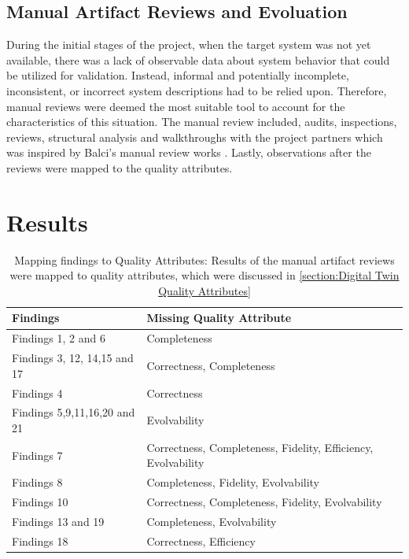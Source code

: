 \documentclass{llncs}
\begin{document}
    \subsection{Manual Artifact Reviews and Evoluation}
    During the initial stages of the project, when the target system was not yet available, there was a lack of observable data about system behavior that could be utilized for validation. 
    Instead, informal and potentially incomplete, inconsistent, or incorrect system descriptions had to be relied upon. Therefore, manual reviews were deemed the most suitable tool to account for the characteristics of this situation.
    The manual review included, audits, inspections, reviews, structural analysis 
    and walkthroughs with the project partners which was inspired by Balci's manual review works \cite{balcitechniques}. Lastly, observations after the reviews were mapped to the quality attributes. 
    \section{Results}
    

    \begin{table}[h!]
        \begin{center}
          \caption{Mapping findings to Quality Attributes: Results of the manual artifact reviews were mapped to quality attributes, which were discussed in \ref{section:Digital Twin Quality Attributes}}
          \label{tab:Mapping}
          \begin{tabular}{l@{\hspace{1cm}}l} 
            \textbf{Findings} & \textbf{Missing Quality Attribute}\\
            \hline
            Findings 1, 2 and 6 &     Completeness\\
            Findings 3, 12, 14,15 and 17  &     Correctness, Completeness\\
            Findings 4 &     Correctness\\
            Findings 5,9,11,16,20 and 21 &     Evolvability\\
            Findings 7 &     Correctness, Completeness, Fidelity, Efficiency, Evolvability\\
            Findings 8 &     Completeness, Fidelity, Evolvability\\
            Findings 10 &    Correctness, Completeness, Fidelity, Evolvability\\
            Findings 13 and 19 &    Completeness, Evolvability\\
            Findings 18&Correctness, Efficiency \\
    \end{tabular}
    \end{center}
    \end{table}
\end{document}
